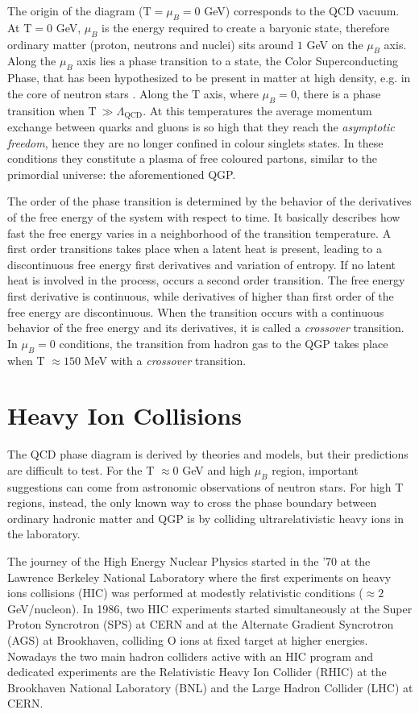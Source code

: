 The origin of the diagram (T$=\mu_{B}=0$ GeV) corresponds to the QCD vacuum. At T$=0$ GeV, $\mu_{B}$ is 
the energy required to create a baryonic state, therefore ordinary matter (proton, neutrons and nuclei)
sits around $1$ GeV on the $\mu_{B}$ axis. Along the $\mu_{B}$ axis lies a phase transition to a state,
the Color Superconducting Phase, that has been hypothesized to be present in matter at high density,
e.g. in  the core of neutron stars \cite{csp}.
Along the T axis, where $\mu_{B}=0$, there is a phase transition when T$\ \gg \Lambda_{\mathrm{QCD}}$. 
At this temperatures the average momentum exchange between quarks and gluons is so high that they reach
the \textit{asymptotic freedom}, hence they are no longer confined in colour singlets states.
In these conditions they constitute a plasma of free coloured partons, similar to the primordial 
universe: the aforementioned QGP.

The order of the phase transition is determined by the behavior of the derivatives of the free energy
of the system with respect to time. It basically describes how fast the free energy varies in a 
neighborhood of the transition temperature.
A first order transitions takes place when a latent heat is present, leading to a discontinuous free
energy first derivatives and variation of entropy.
If no latent heat is involved in the process, occurs a second order transition. The free energy 
first derivative is continuous, while derivatives of higher than first order of the free energy are 
discontinuous.
When the transition occurs with a continuous behavior of the free energy and its derivatives,
it is called a \textit{crossover} transition.
In $\mu_{B}=0$ conditions, the transition from hadron gas to the QGP takes place when T $\approx 150$ MeV
with a \textit{crossover} transition.

%
%
\section{Heavy Ion Collisions}
\label{sec:1.3}

The QCD phase diagram is derived by theories and models, but their predictions are difficult to test.
For the T $\approx0$ GeV and high $\mu_{B}$ region, important suggestions can come from astronomic observations 
of neutron stars. 
For high T regions, instead, the only known way to cross the phase boundary between ordinary hadronic matter
and QGP is by colliding ultrarelativistic heavy ions in the laboratory.

The journey of the High Energy Nuclear Physics started in the '70 at the Lawrence Berkeley National Laboratory
where the first experiments on heavy ions collisions (HIC) was performed at modestly relativistic conditions 
($\approx 2\ $ GeV/nucleon).
In 1986, two HIC experiments started simultaneously at the Super Proton Syncrotron (SPS) at CERN and at the
Alternate Gradient Syncrotron (AGS) at Brookhaven, colliding O ions at fixed target at higher energies.
Nowadays the two main hadron colliders active with an HIC program and dedicated experiments are the
Relativistic Heavy Ion Collider (RHIC) at the Brookhaven National Laboratory (BNL) and the Large Hadron
Collider (LHC) at CERN.

